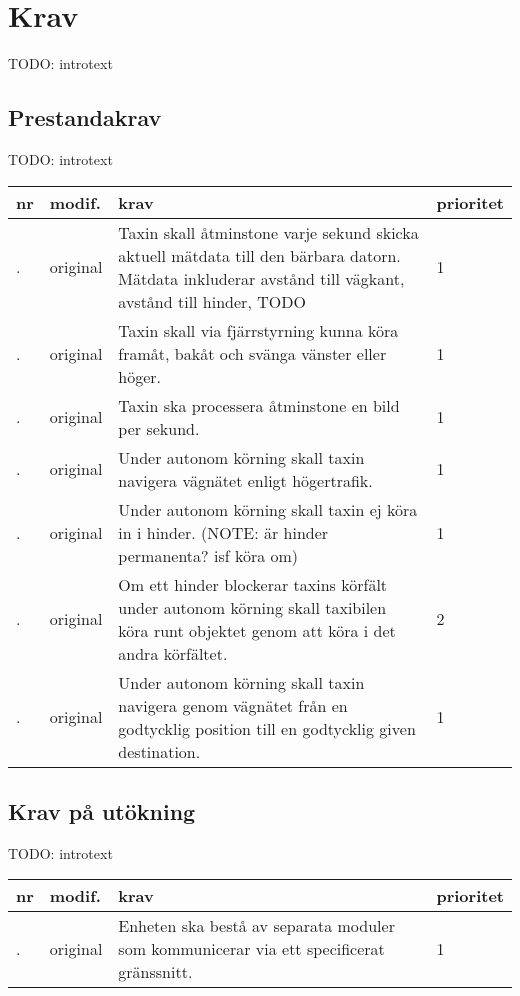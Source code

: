 \documentclass[kravspec/krav.tex]{subfiles}
\newcounter{reqcat} %
\newcounter{reqitem} %
\newenvironment{reqlist}
{
    \stepcounter{reqcat}
    \begin{tabular}{|l|l|p{10cm}|l|}
    \hline
    \bfseries nr &
    \bfseries modif. &
    \bfseries krav &
    \bfseries prioritet \\
}{
    \hline
    \end{tabular}
}
\newcommand{\req}[3]{
    \hline
    \stepcounter{reqitem}\thereqcat.\thereqitem & #1 & #3 & #2 \\
}
\begin{document}
\section{Krav}
TODO: introtext

\subsection{Prestandakrav}
TODO: introtext
\begin{reqlist}
\req{original}{1}{
    Taxin skall åtminstone varje sekund skicka aktuell mätdata till den bärbara
    datorn. Mätdata inkluderar avstånd till vägkant, avstånd till hinder, TODO
}
\req{original}{1}{
    Taxin skall via fjärrstyrning kunna köra framåt, bakåt och svänga vänster
    eller höger.
}
\req{original}{1}{
    Taxin ska processera åtminstone en bild per sekund.
}
\req{original}{1}{
    Under autonom körning skall taxin navigera vägnätet enligt högertrafik.
}
\req{original}{1}{
    Under autonom körning skall taxin ej köra in i hinder. (NOTE: är hinder
    permanenta? isf köra om)
}
\req{original}{2}{
    Om ett hinder blockerar taxins körfält under autonom körning skall
    taxibilen köra runt objektet genom att köra i det andra körfältet.
}
\req{original}{1}{
    Under autonom körning skall taxin navigera genom vägnätet från en
    godtycklig position till en godtycklig given destination.
}
\end{reqlist}

\subsection{Krav på utökning}
TODO: introtext

\begin{reqlist}
\req{original}{1}{
    Enheten ska bestå av separata moduler som kommunicerar via ett specificerat
    gränssnitt.
}
\end{reqlist}
\end{document}
